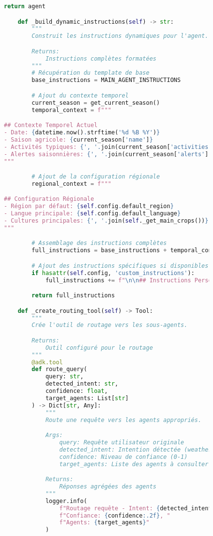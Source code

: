 \begin{figure}[h]
\begin{lstlisting}[language=Python, caption=Structure complète de l'agent principal]
        return agent

    def _build_dynamic_instructions(self) -> str:
        """
        Construit les instructions dynamiques pour l'agent.

        Returns:
            Instructions complètes formatées
        """
        # Récupération du template de base
        base_instructions = MAIN_AGENT_INSTRUCTIONS

        # Ajout du contexte temporel
        current_season = get_current_season()
        temporal_context = f"""

## Contexte Temporel Actuel
- Date: {datetime.now().strftime('%d %B %Y')}
- Saison agricole: {current_season['name']}
- Activités typiques: {', '.join(current_season['activities'])}
- Alertes saisonnières: {', '.join(current_season['alerts'])}
"""

        # Ajout de la configuration régionale
        regional_context = f"""

## Configuration Régionale
- Région par défaut: {self.config.default_region}
- Langue principale: {self.config.default_language}
- Cultures principales: {', '.join(self._get_main_crops())}
"""

        # Assemblage des instructions complètes
        full_instructions = base_instructions + temporal_context + regional_context

        # Ajout des instructions spécifiques si disponibles
        if hasattr(self.config, 'custom_instructions'):
            full_instructions += f"\n\n## Instructions Personnalisées\n{self.config.custom_instructions}"

        return full_instructions

    def _create_routing_tool(self) -> Tool:
        """
        Crée l'outil de routage vers les sous-agents.

        Returns:
            Outil configuré pour le routage
        """
        @adk.tool
        def route_query(
            query: str,
            detected_intent: str,
            confidence: float,
            target_agents: List[str]
        ) -> Dict[str, Any]:
            """
            Route une requête vers les agents appropriés.

            Args:
                query: Requête utilisateur originale
                detected_intent: Intention détectée (weather, crops, etc.)
                confidence: Niveau de confiance (0-1)
                target_agents: Liste des agents à consulter

            Returns:
                Réponses agrégées des agents
            """
            logger.info(
                f"Routage requête - Intent: {detected_intent}, "
                f"Confiance: {confidence:.2f}, "
                f"Agents: {target_agents}"
            )


\end{lstlisting}
\end{figure}
